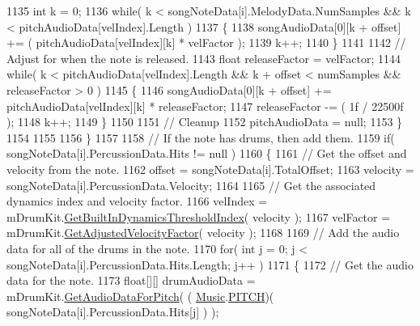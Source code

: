 \begin{DoxyCodeInclude}
1135                     \textcolor{keywordtype}{int} k = 0;
1136                     \textcolor{keywordflow}{while}( k < songNoteData[i].MelodyData.NumSamples && k < pitchAudioData[velIndex].Length
       )
1137                     \{
1138                         songAudioData[0][k + offset] += ( pitchAudioData[velIndex][k] * velFactor );
1139                         k++;
1140                     \}
1141 
1142                     \textcolor{comment}{// Adjust for when the note is released.}
1143                     \textcolor{keywordtype}{float} releaseFactor = velFactor;
1144                     \textcolor{keywordflow}{while}( k < pitchAudioData[velIndex].Length && k + offset < numSamples && releaseFactor
       > 0 )
1145                     \{
1146                         songAudioData[0][k + offset] += pitchAudioData[velIndex][k] * releaseFactor;
1147                         releaseFactor -= ( 1f / 22500f );
1148                         k++;
1149                     \}
1150 
1151                     \textcolor{comment}{// Cleanup}
1152                     pitchAudioData = null;
1153                 \}
1154 
1155 
1156             \}
1157 
1158             \textcolor{comment}{// If the note has drums, then add them.}
1159             \textcolor{keywordflow}{if}( songNoteData[i].PercussionData.Hits != null )
1160             \{
1161                 \textcolor{comment}{// Get the offset and velocity from the note.}
1162                 offset = songNoteData[i].TotalOffset;
1163                 velocity = songNoteData[i].PercussionData.Velocity;
1164 
1165                 \textcolor{comment}{// Get the associated dynamics index and velocity factor.}
1166                 velIndex = mDrumKit.\hyperlink{group___v_i_base_pub_func_gacddf07c08c3a8154a6934be22f539788}{GetBuiltInDynamicsThresholdIndex}( 
      velocity );
1167                 velFactor = mDrumKit.\hyperlink{group___v_i_base_pub_func_gae638c68bd0e79d0b99495be69e50f49d}{GetAdjustedVelocityFactor}( velocity );
1168 
1169                 \textcolor{comment}{// Add the audio data for all of the drums in the note.}
1170                 \textcolor{keywordflow}{for}( \textcolor{keywordtype}{int} j = 0; j < songNoteData[i].PercussionData.Hits.Length; j++ )
1171                 \{
1172                     \textcolor{comment}{// Get the audio data for the note.}
1173                     \textcolor{keywordtype}{float}[][] drumAudioData = mDrumKit.\hyperlink{group___v_i_base_pub_func_gaf715f7c3bbd2f1a2fa543b2f0684f8a6}{GetAudioDataForPitch}( (
      \hyperlink{class_music}{Music}.\hyperlink{group___music_enums_ga508f69b199ea518f935486c990edac1d}{PITCH})( songNoteData[i].PercussionData.Hits[j] ) );

\end{DoxyCodeInclude}
